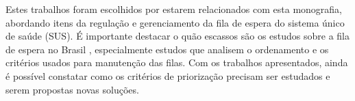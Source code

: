     Estes trabalhos foram escolhidos por estarem relacionados com esta monografia, abordando itens da regulação e gerenciamento da fila de espera do sistema único de saúde (SUS). É importante destacar o quão escassos são os estudos sobre a fila de espera no Brasil \cite{URSULA2018}, especialmente estudos que analisem o ordenamento e os critérios usados para manutenção das filas. 
    Com os trabalhos apresentados, ainda é possível constatar como os critérios de priorização precisam ser estudados e serem propostas novas soluções.